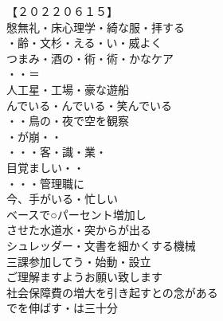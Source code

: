 \begin{multicols}{2}

【２０２２０６１５】\\
慇無礼・床心理学・綺な服・拝する\\
・齢・文杉・える・い・威よく\\
つまみ・酒の・術・術・かなケア\\
・・＝\\
人工星・工場・豪な遊船\\
んでいる・んでいる・笑んでいる\\
・・鳥の・夜で空を観察\\
・が崩・・\\
・・・客・識・業・\\
目覚ましい・・\\
・・・管理職に\\

今、手がいる・忙しい\\
ベースで○パーセント増加し\\
させた水道水・突からが出る\\
シュレッダー・文書を細かくする機械\\
三課参加してう・始動・設立\\
ご理解ますようお願い致します\\
社会保障費の増大を引き起すとの念がある\\
でを伸ばす・は三十分\\


\end{multicols}
